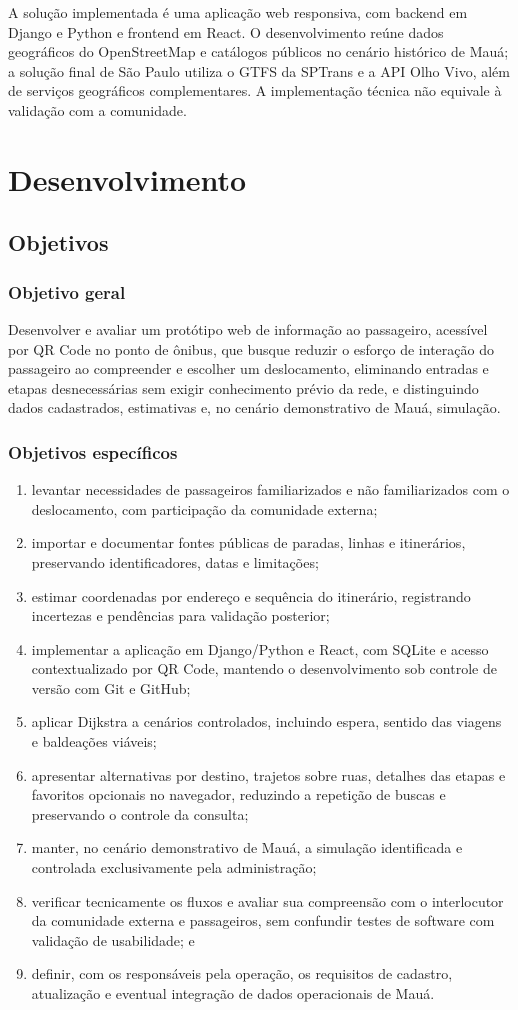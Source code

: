 \documentclass[12pt,oneside,a4paper,brazil,chapter=TITLE]{abntex2}
\let\papsection\section
\renewcommand{\section}{\clearpage\papsection}
\let\papsubsection\subsection
\renewcommand{\subsection}{\clearpage\papsubsection}
\begin{document}
A solução implementada é uma aplicação web responsiva, com backend em Django e Python e frontend em React. O desenvolvimento reúne dados geográficos do OpenStreetMap e catálogos públicos no cenário histórico de Mauá; a solução final de São Paulo utiliza o GTFS da SPTrans e a API Olho Vivo, além de serviços geográficos complementares. A implementação técnica não equivale à validação com a comunidade.

\chapter{Desenvolvimento}
\papsection{Objetivos}
\papsubsection*{Objetivo geral}
Desenvolver e avaliar um protótipo web de informação ao passageiro, acessível por QR Code no ponto de ônibus, que busque reduzir o esforço de interação do passageiro ao compreender e escolher um deslocamento, eliminando entradas e etapas desnecessárias sem exigir conhecimento prévio da rede, e distinguindo dados cadastrados, estimativas e, no cenário demonstrativo de Mauá, simulação.

\papsubsection*{Objetivos específicos}
\begin{enumerate}[label=\alph*)]
\item levantar necessidades de passageiros familiarizados e não familiarizados com o deslocamento, com participação da comunidade externa;
\item importar e documentar fontes públicas de paradas, linhas e itinerários, preservando identificadores, datas e limitações;
\item estimar coordenadas por endereço e sequência do itinerário, registrando incertezas e pendências para validação posterior;
\item implementar a aplicação em Django/Python e React, com SQLite e acesso contextualizado por QR Code, mantendo o desenvolvimento sob controle de versão com Git e GitHub;
\item aplicar Dijkstra a cenários controlados, incluindo espera, sentido das viagens e baldeações viáveis;
\item apresentar alternativas por destino, trajetos sobre ruas, detalhes das etapas e favoritos opcionais no navegador, reduzindo a repetição de buscas e preservando o controle da consulta;
\item manter, no cenário demonstrativo de Mauá, a simulação identificada e controlada exclusivamente pela administração;
\item verificar tecnicamente os fluxos e avaliar sua compreensão com o interlocutor da comunidade externa e passageiros, sem confundir testes de software com validação de usabilidade; e
\item definir, com os responsáveis pela operação, os requisitos de cadastro, atualização e eventual integração de dados operacionais de Mauá.
\end{enumerate}
\end{document}
